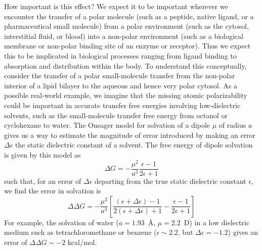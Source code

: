 \documentclass[aps,pre,twocolumn,nofootinbib,superscriptaddress,linenumbers]{revtex4-1}
\begin{document}
How important is this effect?
We expect it to be important wherever we encounter the transfer of a polar molecule (such as a peptide, native ligand, or a pharmaceutical small molecule) from a polar environment (such as the cytosol, interstitial fluid, or blood) into a non-polar environment (such as a biological membrane or non-polar binding site of an enzyme or receptor). Thus we expect this to be implicated in biological processes ranging from ligand binding to absorption and distribution within the body. To understand this conceptually, consider the transfer of a polar small-molecule transfer from the non-polar interior of a lipid bilayer to the aqueous and hence very polar cytosol.
As a possible real-world example, we imagine that the missing atomic polarizability could be important in accurate transfer free energies involving low-dielectric solvents, such as the small-molecule transfer free energy from octanol or cyclohexane to water.  
The Onsager model for solvation of a dipole $\mu$ of radius $a$ gives us a way to estimate the magnitude of error introduced by making an error $\Delta \epsilon$ the static dielectric constant of a solvent.
The free energy of dipole solvation is given by this model as
\begin{equation} \label{eq:onsager}
\Delta G = -\frac{\mu^2}{a^3}\frac{\epsilon - 1}{2 \epsilon + 1}
\end{equation}
such that, for an error of $\Delta \epsilon$ departing from the true static dielectric constant $\epsilon$, we find the error in solvation is
\begin{equation} \label{equation:onsager-error}
\Delta \Delta G = -\frac{\mu^2}{a^3} \left[ \frac{(\epsilon+\Delta \epsilon) - 1}{2 (\epsilon+\Delta \epsilon) + 1} - \frac{\epsilon - 1}{2 \epsilon + 1} \right] 
\end{equation}
For example, the solvation of water ($a = 1.93$~\AA, $\mu = 2.2$~D) in a low dielectric medium such as tetrachloromethane or benzene ($\epsilon \sim 2.2$, but $\Delta \epsilon = -1.2$) gives an error of $\Delta \Delta G \sim -2$ kcal/mol.
\end{document}
